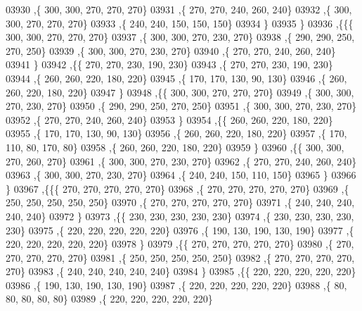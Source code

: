 \begin{DoxyCode}
03930     ,\{   300,   300,   270,   270,   270\}
03931     ,\{   270,   270,   240,   260,   240\}
03932     ,\{   300,   300,   270,   270,   270\}
03933     ,\{   240,   240,   150,   150,   150\}
03934     \}
03935    \}
03936   ,\{\{\{   300,   300,   270,   270,   270\}
03937     ,\{   300,   300,   270,   230,   270\}
03938     ,\{   290,   290,   250,   270,   250\}
03939     ,\{   300,   300,   270,   230,   270\}
03940     ,\{   270,   270,   240,   260,   240\}
03941     \}
03942    ,\{\{   270,   270,   230,   190,   230\}
03943     ,\{   270,   270,   230,   190,   230\}
03944     ,\{   260,   260,   220,   180,   220\}
03945     ,\{   170,   170,   130,    90,   130\}
03946     ,\{   260,   260,   220,   180,   220\}
03947     \}
03948    ,\{\{   300,   300,   270,   270,   270\}
03949     ,\{   300,   300,   270,   230,   270\}
03950     ,\{   290,   290,   250,   270,   250\}
03951     ,\{   300,   300,   270,   230,   270\}
03952     ,\{   270,   270,   240,   260,   240\}
03953     \}
03954    ,\{\{   260,   260,   220,   180,   220\}
03955     ,\{   170,   170,   130,    90,   130\}
03956     ,\{   260,   260,   220,   180,   220\}
03957     ,\{   170,   110,    80,   170,    80\}
03958     ,\{   260,   260,   220,   180,   220\}
03959     \}
03960    ,\{\{   300,   300,   270,   260,   270\}
03961     ,\{   300,   300,   270,   230,   270\}
03962     ,\{   270,   270,   240,   260,   240\}
03963     ,\{   300,   300,   270,   230,   270\}
03964     ,\{   240,   240,   150,   110,   150\}
03965     \}
03966    \}
03967   ,\{\{\{   270,   270,   270,   270,   270\}
03968     ,\{   270,   270,   270,   270,   270\}
03969     ,\{   250,   250,   250,   250,   250\}
03970     ,\{   270,   270,   270,   270,   270\}
03971     ,\{   240,   240,   240,   240,   240\}
03972     \}
03973    ,\{\{   230,   230,   230,   230,   230\}
03974     ,\{   230,   230,   230,   230,   230\}
03975     ,\{   220,   220,   220,   220,   220\}
03976     ,\{   190,   130,   190,   130,   190\}
03977     ,\{   220,   220,   220,   220,   220\}
03978     \}
03979    ,\{\{   270,   270,   270,   270,   270\}
03980     ,\{   270,   270,   270,   270,   270\}
03981     ,\{   250,   250,   250,   250,   250\}
03982     ,\{   270,   270,   270,   270,   270\}
03983     ,\{   240,   240,   240,   240,   240\}
03984     \}
03985    ,\{\{   220,   220,   220,   220,   220\}
03986     ,\{   190,   130,   190,   130,   190\}
03987     ,\{   220,   220,   220,   220,   220\}
03988     ,\{    80,    80,    80,    80,    80\}
03989     ,\{   220,   220,   220,   220,   220\}

\end{DoxyCode}
